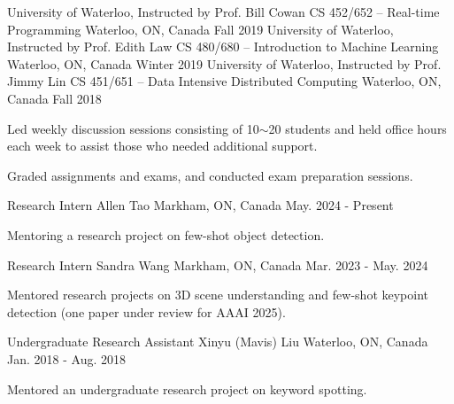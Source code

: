 


\begin{cventries}
\cventrynodesc
{University of Waterloo, Instructed by Prof. Bill Cowan} %
{CS 452/652 -- Real-time Programming} %
{Waterloo, ON, Canada} %
{Fall 2019} %
\cventrynodesc
{University of Waterloo, Instructed by Prof. Edith Law} %
{CS 480/680 -- Introduction to Machine Learning} %
{Waterloo, ON, Canada} %
{Winter 2019} %
\cventry
{University of Waterloo, Instructed by Prof. Jimmy Lin} %
{CS 451/651 -- Data Intensive Distributed Computing} %
{Waterloo, ON, Canada} %
{Fall 2018} %
{ %
\begin{cvitems}
\item {Led weekly discussion sessions consisting of 10$\sim$20 students and held office hours each week to assist those who needed additional support.}
\item {Graded assignments and exams, and conducted exam preparation sessions.}
\end{cvitems}
}
\end{cventries}
\newpage
{}
\begin{cventries}
\cventry
{Research Intern} %
{Allen Tao} %
{Markham, ON, Canada} %
{May. 2024 - Present} %
{ %
\begin{cvitems}
\item {Mentoring a research project on few-shot object detection.}
\end{cvitems}
}
\cventry
{Research Intern} %
{Sandra Wang} %
{Markham, ON, Canada} %
{Mar. 2023 - May. 2024} %
{ %
\begin{cvitems}
\item {Mentored research projects on 3D scene understanding and few-shot keypoint detection (one paper under review for AAAI 2025).}
\end{cvitems}
}
\cventry
{Undergraduate Research Assistant} %
{Xinyu (Mavis) Liu} %
{Waterloo, ON, Canada} %
{Jan. 2018 - Aug. 2018} %
{ %
\begin{cvitems}
\item {Mentored an undergraduate research project on keyword spotting.}
\end{cvitems}
}
\end{cventries}
